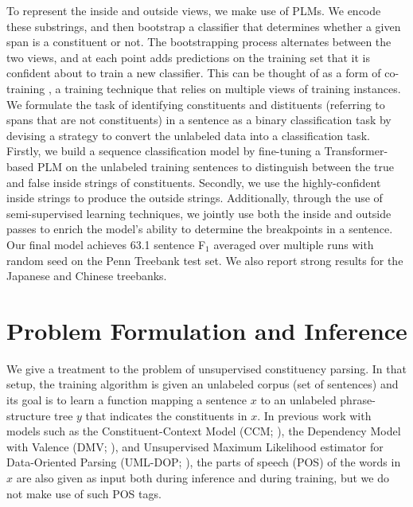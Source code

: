 \documentclass[11pt]{article}
\begin{document}
To represent the inside and outside views, we make use of PLMs. We encode these substrings, and then bootstrap a classifier that determines whether a given span is a constituent or not. The bootstrapping process alternates between the two views, and at each point adds predictions on the training set that it is confident about to train a new classifier. This can be thought of as a form of co-training \citep{yarowsky-1995-unsupervised, 10.1145/279943.279962}, a training technique that relies on multiple views of training instances.
We formulate the task of identifying constituents and distituents (referring to spans that are not constituents) in a sentence as a binary classification task by devising a strategy to convert the unlabeled data into a classification task. Firstly, we build a sequence classification model by fine-tuning a Transformer-based PLM on the unlabeled training sentences to distinguish between the true and false inside strings of constituents. Secondly, we use the highly-confident inside strings to produce the outside strings. Additionally, through the use of semi-supervised learning techniques, we jointly use both the inside and outside passes to enrich the model's ability to determine the breakpoints in a sentence. Our final model achieves 63.1 sentence F$_1$ averaged over multiple runs with random seed on the Penn Treebank test set. 
We also report strong results for the Japanese and Chinese treebanks.
%
 \section{Problem Formulation and Inference}
\label{sec:Parsing-Algorithm}

We give a treatment to the problem of unsupervised constituency parsing. In that setup, the training algorithm is given an unlabeled corpus (set of sentences) and its goal is to learn a function mapping a sentence $x$ to an unlabeled phrase-structure tree $y$ that indicates the constituents in $x$. In previous work with models such as the Constituent-Context Model (CCM; \citealt{klein-manning-2002-generative}), the Dependency Model with Valence (DMV; \citealt{Klein2005NaturalLG}), and Unsupervised Maximum
Likelihood estimator for Data-Oriented Parsing (UML-DOP; \citealt{bod-2006-subtrees}), the parts of speech (POS) of the words in $x$ are also given as input both during inference and during training, but we do not make use of such POS tags.
\end{document}
